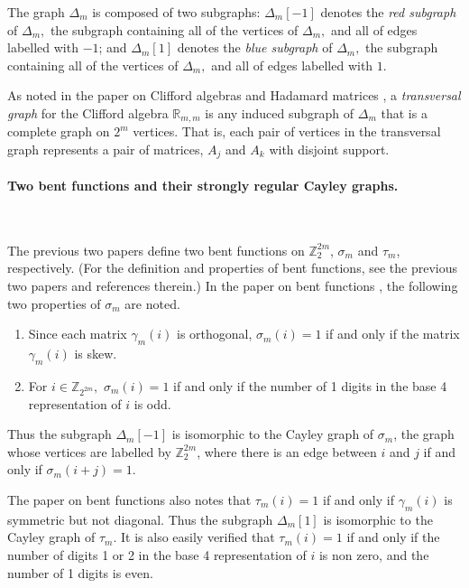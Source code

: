 \documentclass[12pt,a4paper]{article}
\newcommand{\mb}[1]{\mathbb{#1}}
\newcommand{\R}{\mb{R}}
\newcommand{\Z}{\mb{Z}}
\begin{document}
The graph $\varDelta_m$ is composed
of two subgraphs:
$\varDelta_m[-1]$ denotes the \emph{red subgraph} of $\varDelta_m,$
the subgraph containing all of the vertices of $\varDelta_m,$ and all of edges labelled with $-1$;
and $\varDelta_m[1]$ denotes the \emph{blue subgraph} of $\varDelta_m,$
the subgraph containing all of the vertices of $\varDelta_m,$ and all of edges labelled with $1$.

As noted in the paper on Clifford algebras and Hadamard matrices \cite{Leo14Constructions},
a \emph{transversal graph} for the Clifford algebra $\R_{m,m}$
is any induced subgraph of $\varDelta_m$ that is a complete graph on $2^m$ vertices.
That is, each pair of vertices in the transversal graph represents a pair of matrices,
$A_j$ and $A_k$ with disjoint support.
\paragraph*{Two bent functions and their strongly regular Cayley graphs.}
\label{sec-Bent}

~

The previous two papers \cite{Leo14Constructions,Leo15Bent} 
define two bent functions  on $\Z_2^{2 m}$, $\sigma_m$ and $\tau_m$, respectively.
(For the definition and properties of bent functions, see the previous two papers \cite{Leo14Constructions,Leo15Bent}
and references therein.)
\newpage
In the paper on bent functions \cite{Leo15Bent}, the following two properties of $\sigma_m$ are noted.
\begin{enumerate}
 \item 
Since each matrix $\gamma_m(i)$ is orthogonal, $\sigma_m(i) = 1$ if and only if the matrix $\gamma_m(i)$ is skew.
 \item 
For $i \in \Z_{2^{2m}},$ $\sigma_m(i) = 1$ if and only if the number of
1 digits in  the base 4 representation of $i$ is odd.
\end{enumerate}
Thus the subgraph $\varDelta_m[-1]$ is isomorphic to the Cayley graph of $\sigma_m$,
the graph whose vertices are labelled by $\Z_2^{2 m}$,
where there is an edge between $i$ and $j$ if and only if $\sigma_m(i+j)=1$.

The paper on bent functions \cite{Leo15Bent} also notes that 
$\tau_m(i) = 1$ if and only if $\gamma_m(i)$ is symmetric but not diagonal.
Thus the subgraph $\varDelta_m[1]$ is isomorphic to the Cayley graph of $\tau_m$.
It is also easily verified that $\tau_m(i) = 1$ if and only if the number of digits 1 or 2 in the base 4
representation of $i$ is non zero, and the number of 1 digits is even.
\end{document}
